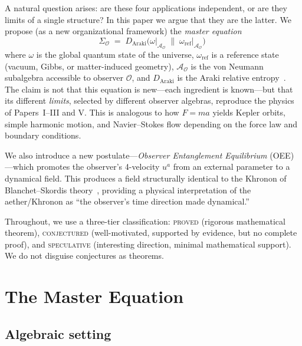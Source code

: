 \documentclass[prd,twocolumn,superscriptaddress,longbibliography,floatfix]{revtex4-2}
\newcommand{\Daraki}{D_{\mathrm{Araki}}}
\newcommand{\Aobs}{\mathcal{A}_{\mathcal{O}}}
\begin{document}
A natural question arises: are these four applications
independent, or are they limits of a single structure?
In this paper we argue that they are the latter.
We propose (as a new organizational framework) the
\emph{master equation}
\begin{equation}
\boxed{\;
\Sigma_{\mathcal{O}}
\;=\; \Daraki\!\bigl(\omega\big|_{\Aobs}
\;\big\|\; \omega_{\mathrm{ref}}\big|_{\Aobs}\bigr)
\;\;}
\label{eq:master}
\end{equation}
where $\omega$ is the global quantum state of the universe,
$\omega_{\mathrm{ref}}$ is a reference state (vacuum, Gibbs,
or matter-induced geometry), $\Aobs$ is the von Neumann
subalgebra accessible to observer $\mathcal{O}$, and
$\Daraki$ is the Araki relative entropy~\cite{Araki1976}.
The claim is not that this equation is new---each ingredient
is known---but that its different \emph{limits}, selected by
different observer algebras, reproduce the physics of
Papers~I--III and V.  This is analogous to how $F = ma$
yields Kepler orbits, simple harmonic motion, and
Navier--Stokes flow depending on the force law and
boundary conditions.

We also introduce a new postulate---\emph{Observer
Entanglement Equilibrium} (OEE)---which promotes
the observer's 4-velocity $u^a$ from an external
parameter to a dynamical field.  This produces a field
structurally identical to the Khronon of
Blanchet--Skordis theory~\cite{BlanchetSkordis2024},
providing a physical interpretation of the aether/Khronon
as ``the observer's time direction made dynamical.''

Throughout, we use a three-tier classification:
\textsc{proved} (rigorous mathematical theorem),
\textsc{conjectured} (well-motivated, supported by
evidence, but no complete proof), and
\textsc{speculative} (interesting direction, minimal
mathematical support).  We do not disguise conjectures
as theorems.


\section{The Master Equation}
\label{sec:master}

\subsection{Algebraic setting}
\end{document}
